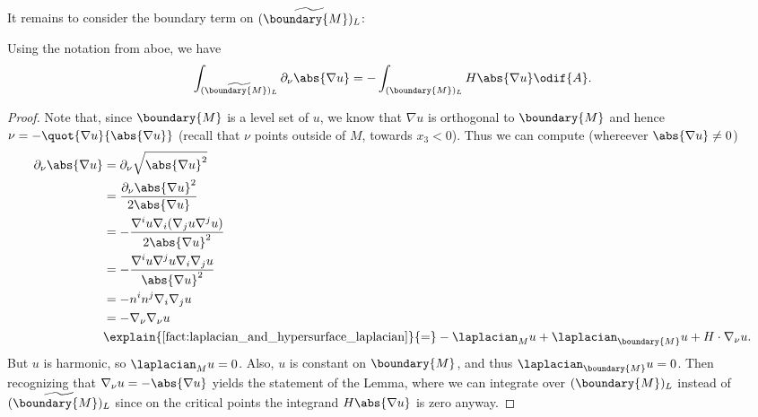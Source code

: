 \documentclass[titlepage,numbers=noenddot,oneside,%
cleardoublepage=empty,paper=a4,fontsize=11pt,%
english,%
]{scrartcl}
\begin{document}
It remains to consider the boundary term on \( \widetilde{(\boundary{M})_L} \):
\begin{lemma}\label{lem:half_space_boundary_boundary_term}
    Using the notation from aboe, we have
    \begin{equation*}
        \int_{\widetilde{(\boundary{M})_L}} \partial_\nu \abs{\nabla u}=-\int_{ (\boundary{M})_L}H\abs{\nabla u}\odif{A}.
    \end{equation*}
\end{lemma}
\begin{proof}
    Note that, since \( \boundary{M} \) is a level set of \( u \), we know that \( \nabla u \) is orthogonal to \( \boundary{M} \) and hence \( \nu=-\quot{\nabla u}{\abs{\nabla u}} \) (recall that \( \nu \) points outside of \( M \), \ie towards \( x_3<0 \)). Thus we can compute (whereever \( \abs{\nabla u}\neq 0 \))
    \begin{equation*}
        \begin{aligned}[t]
            \partial_{\nu}\abs{\nabla u}&=\partial_{\nu} \sqrt{\abs{\nabla u}^2}\\
            &=\frac{\partial_{\nu} \abs{\nabla u}^2}{2\abs{\nabla u}}\\
            &=-\frac{\nabla^i u \nabla_i(\nabla_j u \nabla^j u)}{2\abs{\nabla u}^2}\\
            &=-\frac{\nabla^i u \nabla^j u \nabla_i \nabla_j u}{\abs{\nabla u}^2}\\
            &=-n^i n^j \nabla_i \nabla_j u\\
            &=-\nabla_{\nu}\nabla_{\nu} u\\
            &\explain{\text{\cref{fact:laplacian_and_hypersurface_laplacian}}}{=}-\laplacian_M u+\laplacian_{\boundary{M}} u +H\cdot \nabla_{\nu} u.
        \end{aligned}
    \end{equation*}
    But \( u \) is harmonic, so \( \laplacian_M u=0 \). Also, \( u \) is constant on \( \boundary{M} \), and thus \( \laplacian_{\boundary{M}}u=0 \). Then recognizing that \( \nabla_{\nu} u=-\abs{\nabla u} \) yields the statement of the Lemma, where we can integrate over \(  (\boundary{M})_L \) instead of \( \widetilde{(\boundary{M})_L} \) since on the critical points the integrand \( H\abs{\nabla u} \) is zero anyway.
\end{proof}
\end{document}
